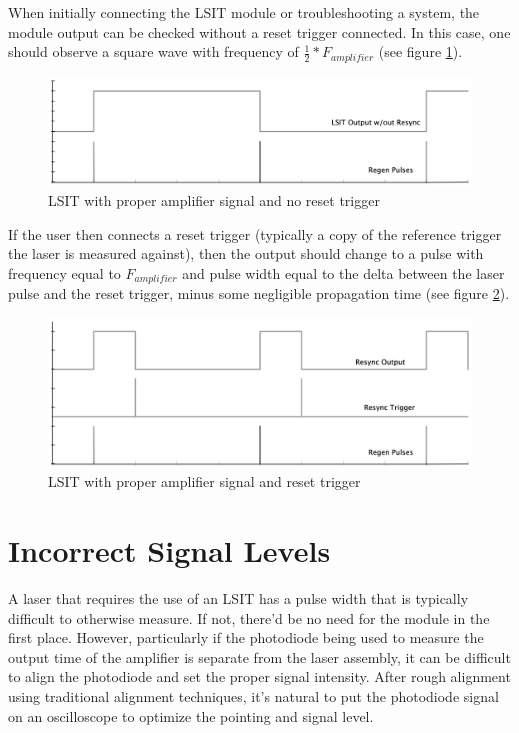 \documentclass{article}
\begin{document}
When initially connecting the LSIT module or troubleshooting a system, the module output can be checked without a reset trigger connected. In this case, one should observe a square wave with frequency of $\frac{1}{2}*F_{amplifier}$ (see figure \ref{noreset}).
\begin{figure}[h]
\includegraphics[width=\textwidth]{rsc/LSIT_withoutreset.png}
\caption{LSIT with proper amplifier signal and no reset trigger}\label{noreset}
\end{figure}

If the user then connects a reset trigger (typically a copy of the reference trigger the laser is measured against), then the output should change to a pulse with frequency equal to $F_{amplifier}$ and pulse width equal to the delta between the laser pulse and the reset trigger, minus some negligible propagation time (see figure \ref{reset}). 
\begin{figure}[h]
    \includegraphics[width=\textwidth]{rsc/LSIT_withreset.png}
    \caption{LSIT with proper amplifier signal and reset trigger}\label{reset}
    \end{figure}

\section{Incorrect Signal Levels}
A laser that requires the use of an LSIT has a pulse width that is typically difficult to otherwise measure. If not, there'd be no need for the module in the first place. However, particularly if the photodiode being used to measure the output time of the amplifier is separate from the laser assembly, it can be difficult to align the photodiode and set the proper signal intensity. After rough alignment using traditional alignment techniques, it's natural to put the photodiode signal on an oscilloscope to optimize the pointing and signal level.
\end{document}
